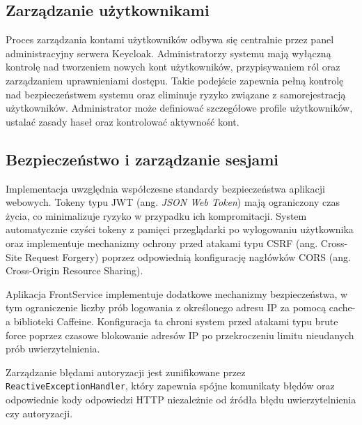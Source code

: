 \subsection{Zarządzanie użytkownikami}

Proces zarządzania kontami użytkowników odbywa się centralnie przez panel administracyjny serwera Keycloak. Administratorzy systemu mają wyłączną kontrolę nad tworzeniem nowych kont użytkowników, przypisywaniem ról oraz zarządzaniem uprawnieniami dostępu. Takie podejście zapewnia pełną kontrolę nad bezpieczeństwem systemu oraz eliminuje ryzyko związane z samorejestracją użytkowników. Administrator może definiować szczegółowe profile użytkowników, ustalać zasady haseł oraz kontrolować aktywność kont. 

\subsection{Bezpieczeństwo i zarządzanie sesjami}

Implementacja uwzględnia współczesne standardy bezpieczeństwa aplikacji webowych. Tokeny typu JWT (ang. \textit{JSON Web Token}) mają ograniczony czas życia, co minimalizuje ryzyko w przypadku ich kompromitacji. System automatycznie czyści tokeny z pamięci przeglądarki po wylogowaniu użytkownika oraz implementuje mechanizmy ochrony przed atakami typu CSRF (ang. Cross-Site Request Forgery) poprzez odpowiednią konfigurację nagłówków CORS (ang. Cross-Origin Resource Sharing).

Aplikacja FrontService implementuje dodatkowe mechanizmy bezpieczeństwa, w tym ograniczenie liczby prób logowania z określonego adresu IP za pomocą cache-a biblioteki Caffeine. Konfiguracja ta chroni system przed atakami typu brute force poprzez czasowe blokowanie adresów IP po przekroczeniu limitu nieudanych prób uwierzytelnienia.

Zarządzanie błędami autoryzacji jest zunifikowane przez \texttt{ReactiveExceptionHandler}, który zapewnia spójne komunikaty błędów oraz odpowiednie kody odpowiedzi HTTP niezależnie od źródła błędu uwierzytelnienia czy autoryzacji. 